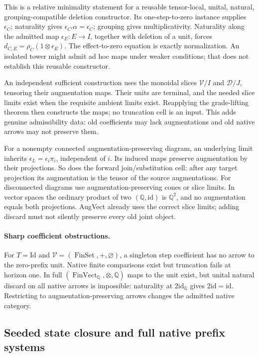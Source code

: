 \documentclass[11pt]{article}
\newcommand{\id}{\mathrm{id}}
\begin{document}
This is a relative minimality statement for a reusable tensor-local, unital, natural, grouping-compatible deletion constructor. Its one-step-to-zero instance supplies $\epsilon_C$; naturality gives $\epsilon_{C'}\alpha=\epsilon_C$; grouping gives multiplicativity. Naturality along the admitted map $\epsilon_E:E\to I$, together with deletion of a unit, forces $d_{C,E}=\rho_C(1\otimes\epsilon_E)$. The effect-to-zero equation is exactly normalization. An isolated tower might admit ad hoc maps under weaker conditions; that does not establish this reusable constructor.

An independent sufficient construction uses the monoidal slices $\mathcal V/I$ and $\mathcal D/J$, tensoring their augmentation maps. Their units are terminal, and the needed slice limits exist when the requisite ambient limits exist. Reapplying the grade-lifting theorem then constructs the maps; no truncation cell is an input. This adds genuine admissibility data: old coefficients may lack augmentations and old native arrows may not preserve them.

For a nonempty connected augmentation-preserving diagram, an underlying limit inherits $\epsilon_L=\epsilon_i\pi_i$, independent of $i$. Its induced maps preserve augmentation by their projections. So does the forward join/substitution cell: after any target projection its augmentation is the tensor of the source augmentations. For disconnected diagrams use augmentation-preserving cones or slice limits. In vector spaces the ordinary product of two $(\mathbb Q,\id)$ is $\mathbb Q^2$, and no augmentation equals both projections. AugVect already uses the correct slice limits; adding discard must not silently preserve every old joint object.

\paragraph{Sharp coefficient obstructions.} For $T=\mathrm{Id}$ and $\mathcal V=(\operatorname{FinSet},+,\varnothing)$, a singleton step coefficient has no arrow to the zero-prefix unit. Native finite comparisons exist but truncation fails at horizon one. In full $(\operatorname{FinVect}_{\mathbb Q},\otimes,\mathbb Q)$ maps to the unit exist, but unital natural discard on all native arrows is impossible: naturality at $2\id_{\mathbb Q}$ gives $2\id=\id$. Restricting to augmentation-preserving arrows changes the admitted native category.

\subsection{Seeded state closure and full native prefix systems}
\end{document}
